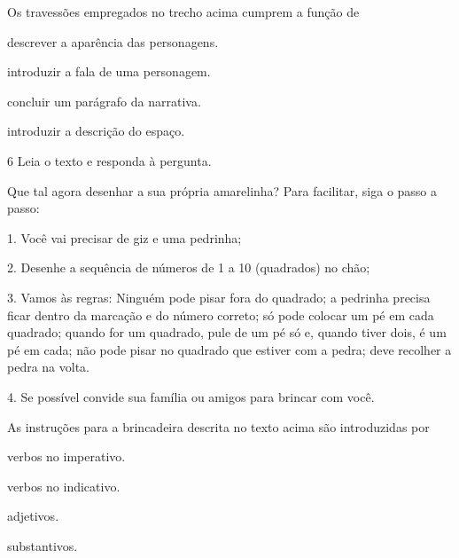 Os travessões empregados no trecho acima cumprem a função de

\begin{escolha}
  \item descrever a aparência das personagens.

  \item introduzir a fala de uma personagem.

  \item concluir um parágrafo da narrativa.

  \item introduzir a descrição do espaço.
\end{escolha}

\num{6} Leia o texto e responda à pergunta.

\begin{myquote}
Que tal agora desenhar a sua própria amarelinha? Para facilitar, siga o
passo a passo:

1. Você vai precisar de giz e uma pedrinha;

2. Desenhe a sequência de números de 1 a 10 (quadrados) no chão;

3. Vamos às regras: Ninguém pode pisar fora do quadrado; a pedrinha
precisa ficar dentro da marcação e do número correto; só pode colocar um
pé em cada quadrado; quando for um quadrado, pule de um pé só e, quando
tiver dois, é um pé em cada; não pode pisar no quadrado que estiver com a
pedra; deve recolher a pedra na volta.

4. Se possível convide sua família ou amigos para brincar com você.

\end{myquote}

As instruções para a brincadeira descrita no texto acima são
introduzidas por

\begin{multicols}{2}
\begin{escolha}
  \item verbos no imperativo.

  \item verbos no indicativo.

  \item adjetivos.

  \item substantivos.
\end{escolha}
\end{multicols}


